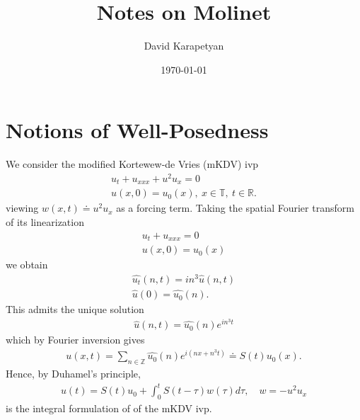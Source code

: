 \documentclass[12pt,reqno]{amsart}
\numberwithin{equation}{section}  %
\newcommand{\rr}{\mathbb{R}}
\newcommand{\zz}{\mathbb{Z}}
\newcommand{\ci}{\mathbb{T}}
\newcommand{\wh}{\widehat}
\begin{document}
\title{Notes on Molinet}
\author{David Karapetyan}
\address{Department of Mathematics  \\
    University  of Notre Dame\\
        Notre Dame, IN 46556 }
        \date{\today}
        \maketitle
        \section{Notions of Well-Posedness}
        We consider the modified 
        Kortewew-de Vries (mKDV) ivp
        \begin{gather}
          \label{mkdv}
          u_{t} + u_{xxx} + u^{2} u_{x} = 0
          \\
          u(x,0) = u_{0}(x), \ x \in \ci, \ t \in \rr.
          \label{mkdv-init}
        \end{gather}
        viewing $w(x,t) \doteq u^{2} u_{x}$ as a forcing term.
        Taking the spatial Fourier transform of its linearization
        \begin{gather*}
          \label{lin-mkdv}
          u_{t} + u_{xxx} =0
          \\
          u(x,0) = u_{0}(x)
          \label{lin-mkdv-init}
        \end{gather*}
 we obtain
 \begin{equation*}
 \begin{split}
   \wh{u_{t}}(n, t) =  i n^{3}\wh{u}(n,t) 
   \\
   \wh{u}(0) = \wh{u_{0}}(n).
 \end{split}
 \end{equation*}
 This admits the unique solution
 \begin{equation*}
 \begin{split}
   \wh{u}(n,t) = \wh{u_{0}}(n) e^{i n^{3}t}
 \end{split}
 \end{equation*}
 which by Fourier inversion gives
 \begin{equation*}
 \begin{split}
   u(x,t) = \sum_{n \in \zz} \wh{u_{0}}(n) e^{i\left( nx + n^{3}t \right)} \doteq S(t)u_{0}(x).  \end{split}
 \end{equation*}
Hence, by Duhamel's principle, 
%
%
\begin{equation}
  \label{int-reform-mkdv}
\begin{split}
  u(t) = S(t)u_{0} + \int_{0}^{t} S(t- \tau) w(\tau) d \tau, \quad w =
  -u^{2}u_{x}
\end{split}
\end{equation}
%
%
is the integral formulation of of the mKDV ivp. 
\end{document}
